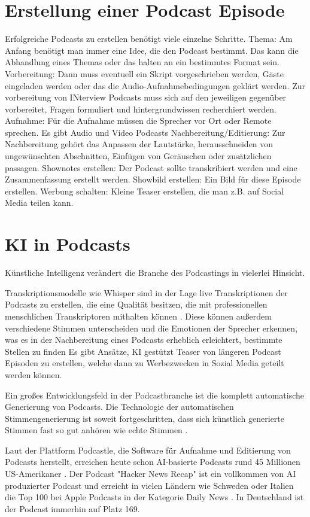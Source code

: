 \section{Erstellung einer Podcast Episode}

Erfolgreiche Podcasts zu erstellen benötigt viele einzelne Schritte.
Thema:
Am Anfang benötigt man immer eine Idee, die den Podcast bestimmt.
Das kann die Abhandlung eines Themas oder das halten an ein bestimmtes Format sein.
Vorbereitung:
Dann muss eventuell ein Skript vorgeschrieben werden, Gäste eingeladen werden oder das die Audio-Aufnahmebedingungen geklärt werden.
Zur vorbereitung von INterview Podcasts muss sich auf den jeweiligen gegenüber vorbereitet, Fragen formuliert und hintergrundwissen recherchiert werden.
Aufnahme:
Für die Aufnahme müssen die Sprecher vor Ort oder Remote sprechen.
Es gibt Audio und Video Podcasts
Nachbereitung/Editierung:
Zur Nachbereitung gehört das Anpassen der Lautstärke, herausschneiden von ungewünschten Abschnitten, Einfügen von Geräuschen oder zusätzlichen passagen.
Shownotes erstellen:
Der Podcast sollte transkribiert werden und eine Zusammenfassung erstellt werden.
Showbild erstellen:
Ein Bild für diese Episode erstellen.
Werbung schalten:
Kleine Teaser erstellen, die man z.B. auf Social Media teilen kann.


\section{KI in Podcasts}

Künstliche Intelligenz verändert die Branche des Podcastings in vielerlei Hinsicht. 

Transkriptionsmodelle wie Whisper sind in der Lage live Transkriptionen der Podcasts zu erstellen, die eine Qualität besitzen, die mit professionellen menschlichen Transkriptoren mithalten können \cite{radford}.
Diese können außerdem verschiedene Stimmen unterscheiden und die Emotionen der Sprecher erkennen, was es in der Nachbereitung eines Podcasts erheblich erleichtert, bestimmte Stellen zu finden \cite{wagner2023}
Es gibt Ansätze, KI gestützt Teaser von längeren Podcast Episoden zu erstellen, welche dann zu Werbezwecken in Sozial Media geteilt werden können. \cite{wang2023}

Ein großes Entwicklungsfeld in der Podcastbranche ist die komplett automatische Generierung von Podcasts. Die Technologie der automatischen Stimmengenerierung ist soweit fortgeschritten, dass sich künstlich generierte Stimmen fast so gut anhören wie echte Stimmen \cite{shi2023}.

Laut der Plattform Podcastle, die Software für Aufnahme und Editierung von Podcasts herstellt, 
erreichen heute schon AI-basierte Podcasts rund 45 Millionen US-Amerikaner \cite{podcastle2023}.
Der Podcast "Hacker News Recap" ist ein vollkommen von AI produzierter Podcast und erreicht in vielen Ländern wie Schweden oder Italien die Top 100 bei Apple Podcasts in der Kategorie Daily News \cite{chartable}.
In Deutschland ist der Podcast immerhin auf Platz 169.